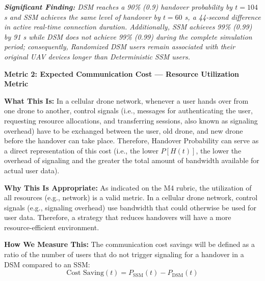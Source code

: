 \documentclass[11pt]{article}
\newcommand{\subquestion}[1]{
    \vspace{0.3cm}
    \noindent\textbf{#1}
    \vspace{0.1cm}
}
\newcommand{\highlight}[1]{\textit{#1}}
\begin{document}
\begin{enumerate}[label=\textbf{Scribe Question \arabic*:}, leftmargin=*, itemsep=1.5em]
\highlight{\textbf{Significant Finding:} DSM reaches a 90\% (0.9) handover probability by $t=104$ s
and SSM achieves the same level of handover by $t=60$ s, a 44-second difference in active
real-time connection duration. Additionally, SSM achieves 99\% (0.99) by 91 s while DSM does not
achieve 99\% (0.99) during the complete simulation period; consequently, Randomized DSM users
remain associated with their original UAV devices longer than Deterministic SSM users.}

\subquestion{Metric 2: Expected Communication Cost --- Resource Utilization Metric}

\textbf{What This Is:} In a cellular drone network, whenever a user hands over from one drone to
another, control signals (i.e., messages for authenticating the user, requesting resource allocations,
and transferring sessions, also known as signaling overhead) have to be exchanged between the user,
old drone, and new drone before the handover can take place. Therefore, Handover Probability can
serve as a direct representation of this cost (i.e., the lower $P[H(t)]$, the lower the overhead of
signaling and the greater the total amount of bandwidth available for actual user data).

\textbf{Why This Is Appropriate:} As indicated on the M4 rubric, the utilization of all resources
(e.g., network) is a valid metric. In a cellular drone network, control signals (e.g., signaling overhead)
use bandwidth that could otherwise be used for user data. Therefore, a strategy that reduces
handovers will have a more resource-efficient environment.

\textbf{How We Measure This:} The communication cost savings will be defined as a ratio of the
number of users that do not trigger signaling for a handover in a DSM compared to an SSM:
\[
\text{Cost Saving}(t) = P_{\text{SSM}}(t) - P_{\text{DSM}}(t)
\]


\end{enumerate}
\end{document}
